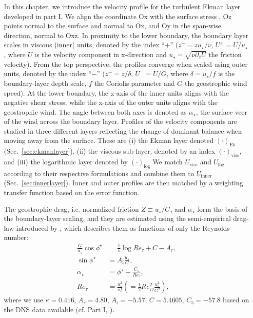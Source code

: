 \documentclass[smallcondensed,draft]{svjour3} %
\newcommand{\p}{\partial}
\providecommand{\DIFadd}[1]{{\protect\color{blue}\uwave{#1}}} %
\providecommand{\DIFaddbegin}{} %
\providecommand{\DIFaddend}{} %
\newcommand{\DIFaddincludegraphics}[2][]{{\color{blue}\fbox{\DIFOincludegraphics[#1]{#2}}}} %
\DeclareRobustCommand{\DIFaddbegin}{\DIFOaddbegin \let\includegraphics\DIFaddincludegraphics} %
\DeclareRobustCommand{\DIFaddend}{\DIFOaddend \let\includegraphics\DIFOincludegraphics} %
\begin{document}
In this chapter, we introduce the velocity profile for the turbulent Ekman layer developed in part I. 
We align the coordinate Ox with the surface stress \DIFaddbegin \DIFadd{(\mbox{%
\cite{ansorge:BM2019}}\hspace{0pt}%
)}\DIFaddend , Oz points normal to the surface and normal to Ox, and Oy in the span-wise direction, normal to Oxz. In proximity to the lower boundary, the boundary layer scales in viscous (inner) units, denoted by the index ``$+$'' ($z^+ = zu_\star/\nu$, $U^+=U/u_\star$, where $U$ is the velocity component in x-direction and $u_\star = \sqrt{\nu \p_z U}$ the friction velocity). From the top perspective, the profiles converge when scaled using outer units, denoted by the index ``$-$'' ($z^-=z/\delta$, $U^-=U/G$, where $\delta=u_\star/f$ is the boundary-layer depth scale, $f$ the Coriolis parameter and $G$ the geostrophic wind speed). 
At the lower boundary, the x-axis of the inner units aligns with the negative shear stress, while the x-axis of the outer units aligns with the geostrophic wind. The angle between both axes is denoted as $\alpha_\star$, the surface veer of the wind across the boundary layer. 
%
Profiles of the velocity components are studied in three different layers reflecting the change of dominant balance when moving away from the surface. These are
(i) the Ekman layer denoted $(\cdot)_\text{Ek}$ (Sec.~\ref{sec:ekmanlayer}), 
(ii) the viscous sub-layer, denoted by an index $(\cdot)_\text{visc}$, 
and (iii) the logarithmic layer denoted by $(\cdot)_\text{log}$
We match $U_\text{visc}$ and $U_\text{log}$ according to their respective formulations and combine them to $U_\text{inner}$ (Sec.~\ref{sec:innerlayer}).
Inner and outer profiles are then matched by a weighting transfer function based on the error function. 


The geostrophic drag, i.e. normalized friction $Z\equiv u_\star/G$, and $\alpha_\star$ form the basis of the boundary-layer scaling, and they are estimated using the semi-empirical drag-law introduced by \cite{spalart1989theoretical}, which describes them as functions of only the Reynolds number:
\begin{subequations}\label{eqn:drag}
	\begin{align}
		\frac{G}{u_\star}\cos\phi^\star &= \frac{1}{\kappa}\log Re_\tau + C - A_r, \\
		\sin\phi^\star &= A_i\frac{u_\star}{G},\\
		\alpha_\star &= \phi^\star - \frac{C_5}{Re_\tau},\\
		Re_\tau &= \frac{u_\star^2}{\nu f} \left( = \frac{1}{2} Re_{D}^2 \frac{u_{\star}^2}{G^2}\right),
	\end{align}
\end{subequations}
where we use $\kappa = 0.416$, $A_r = 4.80$, $A_i = -5.57$, $C = 5.4605$, $C_5 = -57.8$ based on the DNS data available (cf. Part I, \cite{ansorge2014global}).
\end{document}
